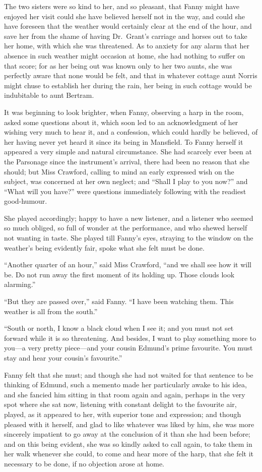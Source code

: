 The two sisters were so kind to her, and so pleasant,
that Fanny might have enjoyed her visit could she have
believed herself not in the way, and could she have
foreseen that the weather would certainly clear at the
end of the hour, and save her from the shame of having
Dr.\ Grant's carriage and horses out to take her home,
with which she was threatened.  As to anxiety for any alarm
that her absence in such weather might occasion at home,
she had nothing to suffer on that score; for as her being
out was known only to her two aunts, she was perfectly
aware that none would be felt, and that in whatever cottage
aunt Norris might chuse to establish her during the rain,
her being in such cottage would be indubitable to aunt Bertram.

It was beginning to look brighter, when Fanny,
observing a harp in the room, asked some questions about it,
which soon led to an acknowledgment of her wishing very
much to hear it, and a confession, which could hardly
be believed, of her having never yet heard it since its
being in Mansfield.  To Fanny herself it appeared a very
simple and natural circumstance.  She had scarcely ever
been at the Parsonage since the instrument's arrival,
there had been no reason that she should; but Miss Crawford,
calling to mind an early expressed wish on the subject,
was concerned at her own neglect; and ``Shall I play
to you now?'' and ``What will you have?'' were questions
immediately following with the readiest good-humour.

She played accordingly; happy to have a new listener,
and a listener who seemed so much obliged, so full
of wonder at the performance, and who shewed herself
not wanting in taste.  She played till Fanny's eyes,
straying to the window on the weather's being evidently fair,
spoke what she felt must be done.

``Another quarter of an hour,'' said Miss Crawford, ``and we
shall see how it will be.  Do not run away the first
moment of its holding up.  Those clouds look alarming.''

``But they are passed over,'' said Fanny.  ``I have been
watching them.  This weather is all from the south.''

``South or north, I know a black cloud when I see it;
and you must not set forward while it is so threatening.
And besides, I want to play something more to you---a very
pretty piece---and your cousin Edmund's prime favourite.
You must stay and hear your cousin's favourite.''

Fanny felt that she must; and though she had not
waited for that sentence to be thinking of Edmund,
such a memento made her particularly awake to his idea,
and she fancied him sitting in that room again and again,
perhaps in the very spot where she sat now, listening with
constant delight to the favourite air, played, as it
appeared to her, with superior tone and expression;
and though pleased with it herself, and glad to like whatever
was liked by him, she was more sincerely impatient to go
away at the conclusion of it than she had been before;
and on this being evident, she was so kindly asked to
call again, to take them in her walk whenever she could,
to come and hear more of the harp, that she felt it
necessary to be done, if no objection arose at home.

